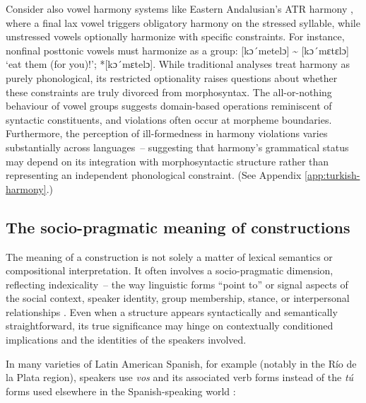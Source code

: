 Consider also vowel harmony systems like Eastern Andalusian's ATR harmony \autocite{Jiménez2007, Lloret2018, Lloret2009}, where a final lax vowel triggers obligatory harmony on the stressed syllable, while unstressed vowels optionally harmonize with specific constraints. For instance, nonfinal posttonic vowels must harmonize as a group: [kɔ´metelɔ] \textasciitilde{} [kɔ´mɛtɛlɔ] `eat them (for you)!'; *[kɔ´mɛtelɔ]. While traditional analyses treat harmony as purely phonological, its restricted optionality raises questions about whether these constraints are truly divorced from morphosyntax. The all-or-nothing behaviour of vowel groups suggests domain-based operations reminiscent of syntactic constituents, and violations often occur at morpheme boundaries. Furthermore, the perception of ill-formedness in harmony violations varies substantially across languages~-- suggesting that harmony's grammatical status may depend on its integration with morphosyntactic structure rather than representing an independent phonological constraint. (See Appendix \ref{app:turkish-harmony}.)




\subsection{The socio-pragmatic meaning of constructions}\label{sec:point3-social}

The meaning of a construction is not solely a matter of lexical semantics or compositional interpretation. It often involves a socio-pragmatic dimension, reflecting indexicality~-- the way linguistic forms ``point to'' or signal aspects of the social context, speaker identity, group membership, stance, or interpersonal relationships \autocite{Eckert2012, Silverstein1976}. Even when a structure appears syntactically and semantically straightforward, its true significance may hinge on contextually conditioned implications and the identities of the speakers involved.

In many varieties of Latin American Spanish, for example (notably in the Río de la Plata region), speakers use \textit{vos} and its associated verb forms instead of the \textit{tú} forms used elsewhere in the Spanish-speaking world \autocite{bertolotti2016}:

\z


